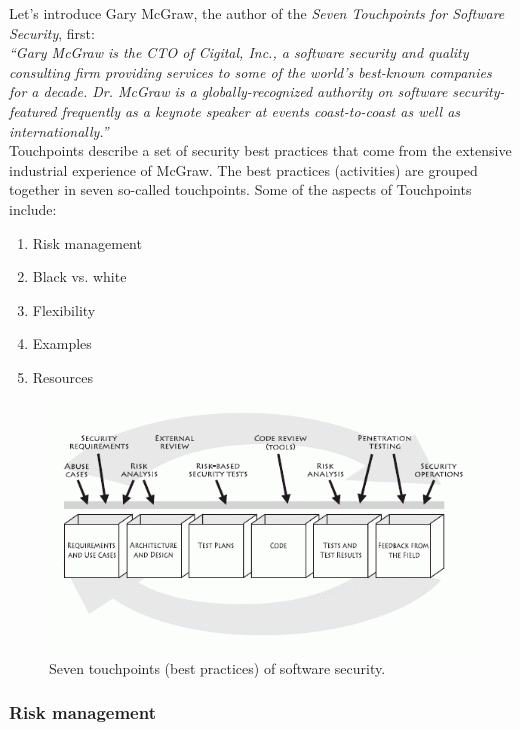\documentclass[12pt,a4,twoside]{article}
\begin{document}
Let's introduce Gary McGraw, the author of the \textit{Seven Touchpoints for Software Security}, first:\\

\textit{``Gary McGraw is the CTO of \textit{Cigital, Inc.}, a software security and quality consulting firm providing services to some of the world's best-known companies for a decade. Dr. McGraw is a globally-recognized authority on software security-featured frequently as a keynote speaker at events coast-to-coast as well as internationally.''} \cite{mcgraw_software_security}\\

Touchpoints describe a set of security best practices that come from the extensive industrial experience of McGraw. The best practices (activities) are grouped together in seven so-called touchpoints. Some of the aspects of Touchpoints include:

\begin{enumerate}
    \item Risk management
    \item Black vs. white
    \item Flexibility
    \item Examples
    \item Resources
\end{enumerate}

\begin{figure}[h]
\centering
\includegraphics[width=1\textwidth]{figures/touchpoints.png}
\caption{Seven touchpoints (best practices) of software security. \cite{mcgraw_software_security}}
\label{fig:touchpoints}
\end{figure}

\subsubsection{Risk management}
\end{document}
